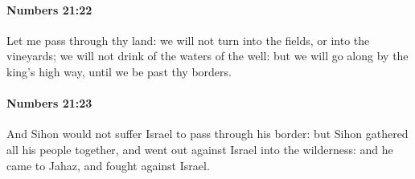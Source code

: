 		\paragraph{Numbers 21:22} %
			\label{NUMBERS-21-22}

			Let me pass through thy land: we will not turn into the fields, or into the vineyards; we will not drink of the waters of the well: but we will go along by the king’s high way, until we be past thy borders.


		\paragraph{Numbers 21:23} %
			\label{NUMBERS-21-23}

			And Sihon would not suffer Israel to pass through his border: but Sihon gathered all his people together, and went out against Israel into the wilderness: and he came to Jahaz, and fought against Israel.

